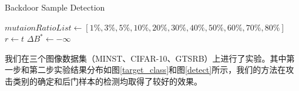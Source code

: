 \documentclass[fontset=macnew,UTF8]{article} %
\begin{document}
\begin{algorithm}
	\caption{Backdoor Sample Detection}
	\label{algorithm}
	$mutaionRatioList \leftarrow [1\%,3\%,5\%,10\%,20\%,30\%,40\%,50\%,60\%,70\%,80\%]$\;
	$r\leftarrow t$ \;
	$\Delta B^{\ast}\leftarrow -\infty$\;
\end{algorithm}

我们在三个图像数据集（MINST、CIFAR-10、GTSRB）上进行了实验。其中第一步和第二步实验结果分布如图\ref{target_class}和图\ref{detect}所示，我们的方法在攻击类别的确定和后门样本的检测均取得了较好的效果。
\end{document}
